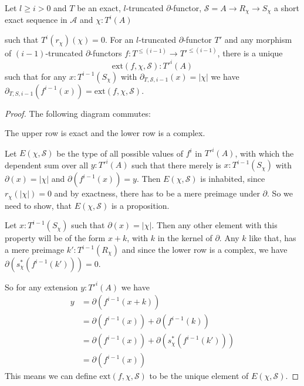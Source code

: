 \begin{lemma}
  \label{lem:extend-map}
  Let $l\geq i>0$ and $T$ be an exact, $l$-truncated $\partial$-functor, $\mathcal{S}=A\to R_\chi\to S_\chi$ a short exact sequence in $\mathcal A$
  and $\chi:T^i(A)$
  \begin{center}
  \end{center}
  such that $T^i(r_\chi)(\chi)=0$.
  For an $l$-truncated $\partial$-functor $T'$
  and any morphism of $(i-1)$-truncated $\partial$-functors $f:T^{\leq (i-1)}\to T'^{\leq (i-1)}$, there is a unique
  \[\mathrm{ext}(f,\chi,\mathcal{S}) : T'^i(A)\]
  such that for any $x:T^{i-1}(S_\chi)$ with $\partial_{T,\mathcal{S},i-1}(x)=|\chi|$ we have $\partial_{T,S,i-1}(f^{i-1}(x))=\mathrm{ext}(f,\chi,\mathcal{S})$.
\end{lemma}

\begin{proof}
  The following diagram commutes:
  \begin{center}
  \end{center}
  The upper row is exact and the lower row is a complex.

  Let $E(\chi,\mathcal{S})$ be the type of all possible values of $f^i$ in $T'^i(A)$,
  with which the dependent sum over all $y:T'^i(A)$ such that there merely is $x:T^{i-1}(S_\chi)$ with $\partial(x)=|\chi|$
  and $\partial(f^{i-1}(x))=y$.
  Then $E(\chi,\mathcal{S})$ is inhabited, since $r_\chi(|\chi|)=0$ and by exactness, there has to be a mere preimage under $\partial$.
  So we need to show, that $E(\chi,\mathcal{S})$ is a proposition.
  
  Let $x:T^{i-1}(S_\chi)$ such that $\partial(x)=|\chi|$.
  Then any other element with this property will be of the form $x+k$, with $k$ in the kernel of $\partial$.
  Any $k$ like that, has a mere preimage $k':T^{i-1}(R_\chi)$ and since the lower row is a complex, we have $\partial(s_\chi^\ast(f^{i-1}(k')))=0$.
  
  So for any extension $y:T'^{i}(A)$ we have
  \begin{align*}
    y &= \partial(f^{i-1}(x+k)) \\
      &= \partial(f^{i-1}(x))+\partial(f^{i-1}(k)) \\
      &= \partial(f^{i-1}(x))+\partial(s_\chi^\ast(f^{i-1}(k'))) \\
      &= \partial(f^{i-1}(x))
  \end{align*}
  This means we can define $\mathrm{ext}(f,\chi,\mathcal{S})$ to be the unique element of $E(\chi,\mathcal{S})$.
\end{proof}

